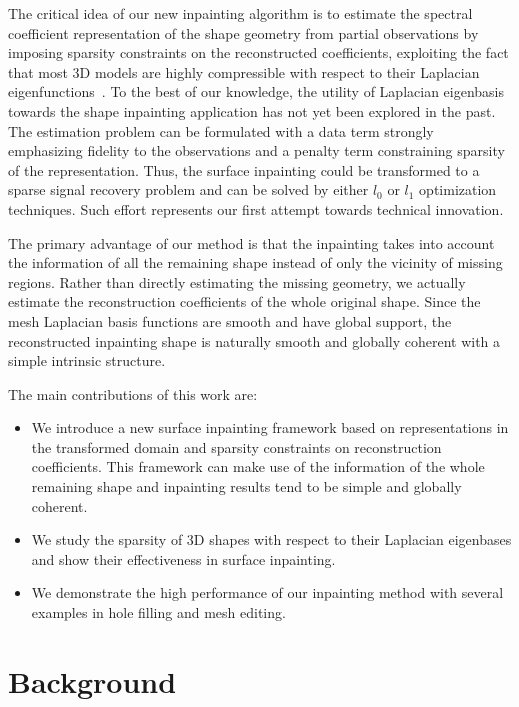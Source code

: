 The critical idea of our new inpainting algorithm is to estimate the
spectral coefficient representation of the shape geometry from partial
observations by imposing sparsity constraints on the reconstructed
coefficients, exploiting the fact that most 3D models are highly
compressible with respect to their Laplacian eigenfunctions~\cite{Karni2000}.
To the best of our knowledge, the utility of Laplacian eigenbasis towards
the shape inpainting application has not yet been explored in the past.
The estimation problem can be formulated with a data term strongly emphasizing
fidelity to the observations and a penalty term constraining sparsity of the
representation. Thus, the surface inpainting could be transformed to a
sparse signal recovery problem and can be solved by either $l_0$ or
$l_1$ optimization techniques. Such effort represents our first
attempt towards technical innovation.

The primary advantage of our method is that the inpainting takes into
account the information of all the remaining shape instead of only the
vicinity of missing regions. Rather than directly estimating the
missing geometry, we actually estimate the reconstruction coefficients
of the whole original shape. Since the mesh Laplacian basis functions are
smooth and have global support, the reconstructed inpainting shape is
naturally smooth and globally coherent with a simple intrinsic
structure.

The main contributions of this work are:
\begin{itemize}

\item We introduce a new surface inpainting framework based on
  representations in the transformed domain and sparsity constraints
  on reconstruction coefficients. This framework can make use of the
  information of the whole remaining shape and inpainting results
  tend to be simple and globally coherent.

\item We study the sparsity of 3D shapes with respect to their
  Laplacian eigenbases and show their effectiveness in surface
  inpainting.

\item We demonstrate the high performance of our inpainting method
  with several examples in hole filling and mesh editing.

\end{itemize}


\section{Background}
\label{sec:related}

